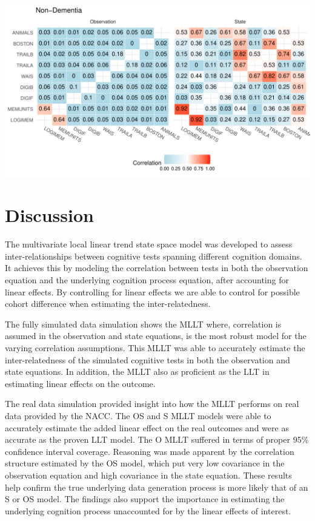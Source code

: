 \documentclass[
]{article}
\begin{document}
\includegraphics{Master_files/figure-latex/unnamed-chunk-45-1.pdf}

\hypertarget{discussion}{%
\section{Discussion}\label{discussion}}

The multivariate local linear trend state space model was developed to assess inter-relationships between cognitive tests spanning different cognition domains. It achieves this by modeling the correlation between tests in both the observation equation and the underlying cognition process equation, after accounting for linear effects. By controlling for linear effects we are able to control for possible cohort difference when estimating the inter-relatedness.

The fully simulated data simulation shows the MLLT where, correlation is assumed in the observation and state equations, is the most robust model for the varying correlation assumptions. This MLLT was able to accurately estimate the inter-relatedness of the simulated cognitive tests in both the observation and state equations. In addition, the MLLT also as proficient as the LLT in estimating linear effects on the outcome.

The real data simulation provided insight into how the MLLT performs on real data provided by the NACC. The OS and S MLLT models were able to accurately estimate the added linear effect on the real outcomes and were as accurate as the proven LLT model. The O MLLT suffered in terms of proper 95\% confidence interval coverage. Reasoning was made apparent by the correlation structure estimated by the OS model, which put very low covariance in the observation equation and high covariance in the state equation. These results help confirm the true underlying data generation process is more likely that of an S or OS model. The findings also support the importance in estimating the underlying cognition process unaccounted for by the linear effects of interest.
\end{document}
